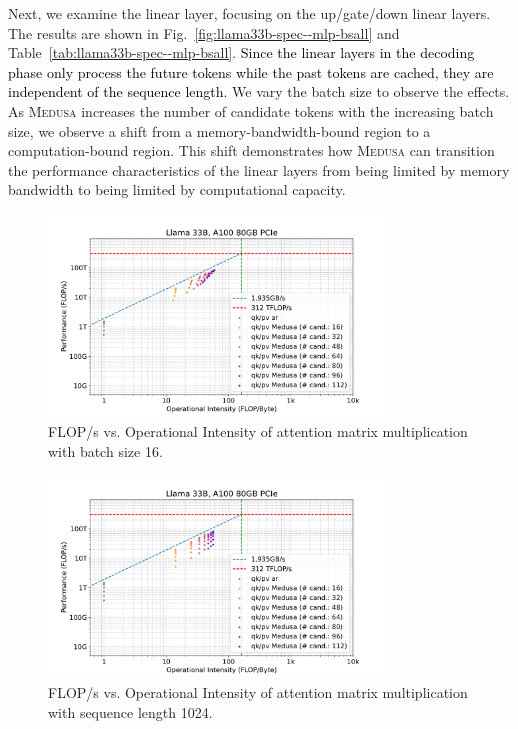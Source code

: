 \documentclass{article}
\theoremstyle{plain}
\theoremstyle{definition}
\theoremstyle{remark}
\newcommand{\ours}
{\textsc{Medusa}\xspace}
\begin{document}
Next, we examine the linear layer, focusing on the up/gate/down linear layers. The results are shown in Fig.~\ref{fig:llama33b-spec--mlp-bsall} and Table~\ref{tab:llama33b-spec--mlp-bsall}. \textcolor{black}{Since the linear layers in the decoding phase only process the future tokens while the past tokens are cached, they are independent of the sequence length.} We vary the batch size to observe the effects. As \ours increases the number of candidate tokens with the increasing batch size, we observe a shift from a memory-bandwidth-bound region to a computation-bound region. This shift demonstrates how \ours can transition the performance characteristics of the linear layers from being limited by memory bandwidth to being limited by computational capacity.

\begin{figure}[h]
    \centering
    \includegraphics[width=0.8\textwidth]{llama33b-spec-bs16.pdf}
    \caption{FLOP/s vs. Operational Intensity of attention matrix multiplication with batch size 16.}
    \label{fig:llama33b-spec-bs16}
\end{figure}

\begin{figure}[h]
    \centering
    \includegraphics[width=0.8\textwidth]{llama33b-spec-seq1024.pdf}
    \caption{FLOP/s vs. Operational Intensity of attention matrix multiplication with sequence length 1024.}
    \label{fig:llama33b-spec-seq1024}
\end{figure}
\end{document}
